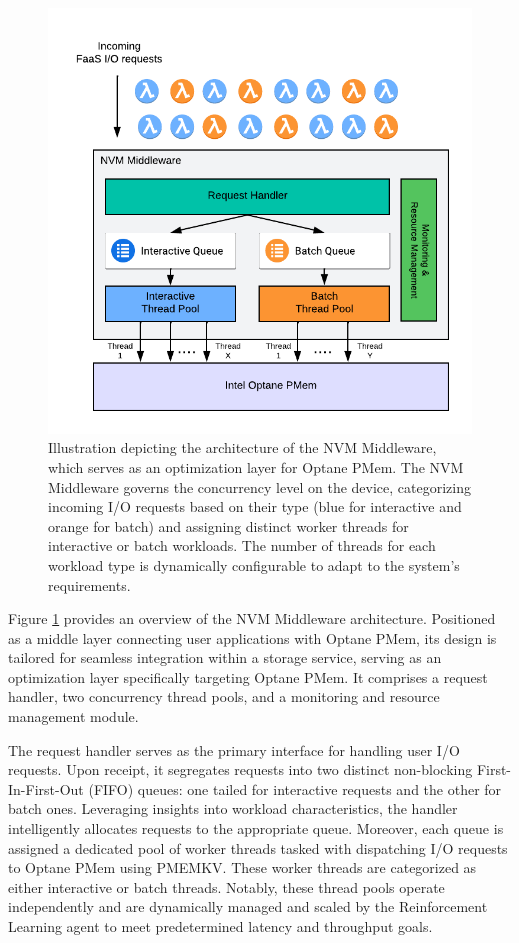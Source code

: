 \begin{figure}[ht]
  \centering
  \includegraphics[scale=1]{images/nvm_design.png}
  \caption[NVM Middleware Architecture]{Illustration depicting the architecture of the NVM Middleware, which serves as an optimization layer for Optane PMem. The NVM Middleware governs the concurrency level on the device, categorizing incoming I/O requests based on their type (blue for interactive and orange for batch) and assigning distinct worker threads for interactive or batch workloads. The number of threads for each workload type is dynamically configurable to adapt to the system's requirements.}
  \label{fig:nvm_architecture}
\end{figure}

Figure \ref{fig:nvm_architecture} provides an overview of the NVM Middleware architecture. Positioned as a middle layer connecting user applications with Optane PMem, its design is tailored for seamless integration within a storage service, serving as an optimization layer specifically targeting Optane PMem. It comprises a request handler, two concurrency thread pools, and a monitoring and resource management module.

The request handler serves as the primary interface for handling user I/O requests. Upon receipt, it segregates requests into two distinct non-blocking First-In-First-Out (FIFO) queues: one tailed for interactive requests and the other for batch ones. Leveraging insights into workload characteristics, the handler intelligently allocates requests to the appropriate queue. Moreover, each queue is assigned a dedicated pool of worker threads tasked with dispatching I/O requests to Optane PMem using PMEMKV. These worker threads are categorized as either interactive or batch threads. Notably, these thread pools operate independently and are dynamically managed and scaled by the Reinforcement Learning agent to meet predetermined latency and throughput goals.

